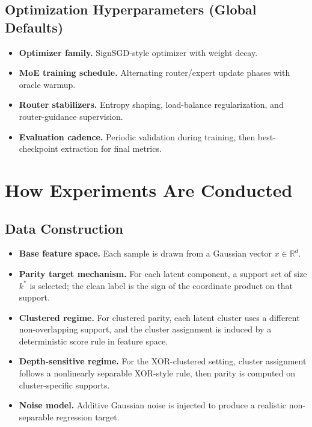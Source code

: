 \documentclass[11pt]{article}
\begin{document}
\subsection{Optimization Hyperparameters (Global Defaults)}
\begin{itemize}
    \item \textbf{Optimizer family.} SignSGD-style optimizer with weight decay.
    \item \textbf{MoE training schedule.} Alternating router/expert update phases with oracle warmup.
    \item \textbf{Router stabilizers.} Entropy shaping, load-balance regularization, and router-guidance supervision.
    \item \textbf{Evaluation cadence.} Periodic validation during training, then best-checkpoint extraction for final metrics.
\end{itemize}

\section{How Experiments Are Conducted}
\subsection{Data Construction}
\begin{itemize}
    \item \textbf{Base feature space.} Each sample is drawn from a Gaussian vector $x \in \mathbb{R}^d$.
    \item \textbf{Parity target mechanism.} For each latent component, a support set of size $k^*$ is selected; the clean label is the sign of the coordinate product on that support.
    \item \textbf{Clustered regime.} For clustered parity, each latent cluster uses a different non-overlapping support, and the cluster assignment is induced by a deterministic score rule in feature space.
    \item \textbf{Depth-sensitive regime.} For the XOR-clustered setting, cluster assignment follows a nonlinearly separable XOR-style rule, then parity is computed on cluster-specific supports.
    \item \textbf{Noise model.} Additive Gaussian noise is injected to produce a realistic non-separable regression target.
\end{itemize}
\end{document}
